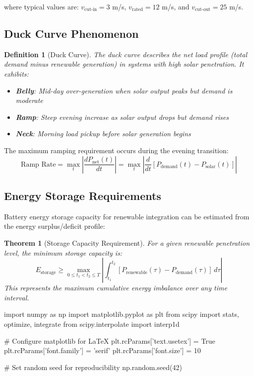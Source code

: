 \documentclass[11pt,a4paper]{article}
\newtheorem{definition}{Definition}[section]
\newtheorem{theorem}{Theorem}[section]
\begin{document}
where typical values are: $v_{\text{cut-in}} = 3$ m/s, $v_{\text{rated}} = 12$ m/s, and
$v_{\text{cut-out}} = 25$ m/s.

\subsection{Duck Curve Phenomenon}

\begin{definition}[Duck Curve]
The duck curve describes the net load profile (total demand minus renewable generation) in systems
with high solar penetration. It exhibits:
\begin{itemize}
\item \textbf{Belly}: Mid-day over-generation when solar output peaks but demand is moderate
\item \textbf{Ramp}: Steep evening increase as solar output drops but demand rises
\item \textbf{Neck}: Morning load pickup before solar generation begins
\end{itemize}
\end{definition}

The maximum ramping requirement occurs during the evening transition:
\begin{equation}
\text{Ramp Rate} = \max_{t} \left| \frac{dP_{\text{net}}(t)}{dt} \right| = \max_{t} \left| \frac{d}{dt}[P_{\text{demand}}(t) - P_{\text{solar}}(t)] \right|
\end{equation}

\subsection{Energy Storage Requirements}

Battery energy storage capacity for renewable integration can be estimated from the energy
surplus/deficit profile:

\begin{theorem}[Storage Capacity Requirement]
For a given renewable penetration level, the minimum storage capacity is:
\begin{equation}
E_{\text{storage}} \geq \max_{0 \leq t_1 < t_2 \leq T} \left| \int_{t_1}^{t_2} [P_{\text{renewable}}(\tau) - P_{\text{demand}}(\tau)] \, d\tau \right|
\end{equation}
This represents the maximum cumulative energy imbalance over any time interval.
\end{theorem}

\begin{pycode}
import numpy as np
import matplotlib.pyplot as plt
from scipy import stats, optimize, integrate
from scipy.interpolate import interp1d

# Configure matplotlib for LaTeX
plt.rcParams['text.usetex'] = True
plt.rcParams['font.family'] = 'serif'
plt.rcParams['font.size'] = 10

# Set random seed for reproducibility
np.random.seed(42)
\end{pycode}
\end{document}
